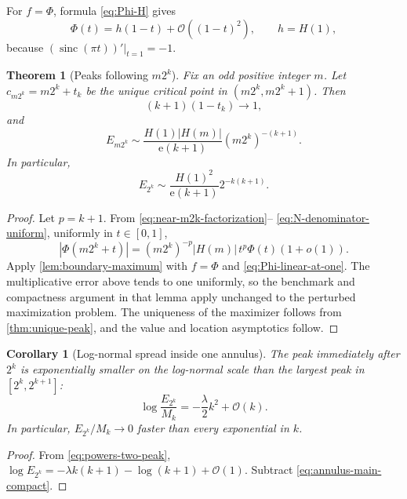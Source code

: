 \documentclass[11pt,oneside]{article}
\newtheorem{theorem}{Theorem}[section]
\newtheorem{corollary}[corollary]{Corollary}
\theoremstyle{definition}
\theoremstyle{remark}
\newcommand{\sinc}{\operatorname{sinc}}
\newcommand{\e}{\mathrm e}
\newcommand{\bigO}{\mathcal O}
\newcommand{\smallo}{o}
\newcommand{\PhiF}{\Phi}
\begin{document}
For \(f=\PhiF\), formula \eqref{eq:Phi-H} gives
\begin{equation}
 \PhiF(t)=h(1-t)+\bigO((1-t)^2),
 \qquad h=H(1),
 \label{eq:Phi-linear-at-one}
\end{equation}
because \((\sinc(\pi t))'|_{t=1}=-1\).

\begin{theorem}[Peaks following \(m2^k\)]
\label{thm:two-adic-peaks}
Fix an odd positive integer \(m\).  Let \(c_{m2^k}=m2^k+t_k\) be the unique
critical point in \((m2^k,m2^k+1)\).  Then
\begin{equation}
 (k+1)(1-t_k)\longrightarrow1,
 \label{eq:two-adic-peak-location}
\end{equation}
and
\begin{equation}
\boxed{
 E_{m2^k}\sim
 \frac{H(1)|H(m)|}{\e(k+1)}
 (m2^k)^{-(k+1)}.}
 \label{eq:two-adic-peak-main}
\end{equation}
In particular,
\begin{equation}
 E_{2^k}\sim
 \frac{H(1)^2}{\e(k+1)}2^{-k(k+1)}.
 \label{eq:powers-two-peak}
\end{equation}
\end{theorem}

\begin{proof}
Let \(p=k+1\).  From \eqref{eq:near-m2k-factorization}--
\eqref{eq:N-denominator-uniform}, uniformly in \(t\in[0,1]\),
\[
 |\PhiF(m2^k+t)|
 =(m2^k)^{-p}|H(m)|\,t^p\PhiF(t)(1+\smallo(1)).
\]
Apply \cref{lem:boundary-maximum} with \(f=\PhiF\) and
\eqref{eq:Phi-linear-at-one}.  The multiplicative error above tends to one
uniformly, so the benchmark and compactness argument in that lemma apply
unchanged to the perturbed maximization problem.  The uniqueness of the
maximizer follows from \cref{thm:unique-peak}, and the value and location
asymptotics follow.
\end{proof}

\begin{corollary}[Log-normal spread inside one annulus]
\label{cor:spread-annulus}
The peak immediately after \(2^k\) is exponentially smaller on the
log-normal scale than the largest peak in \([2^k,2^{k+1}]\):
\begin{equation}
 \log\frac{E_{2^k}}{M_k}
 =-\frac\lambda2k^2+\bigO(k).
 \label{eq:peak-spread}
\end{equation}
In particular, \(E_{2^k}/M_k\to0\) faster than every exponential in \(k\).
\end{corollary}

\begin{proof}
From \eqref{eq:powers-two-peak},
\(
 \log E_{2^k}=-\lambda k(k+1)-\log(k+1)+\bigO(1).
\)
Subtract \eqref{eq:annulus-main-compact}.
\end{proof}
\end{document}
